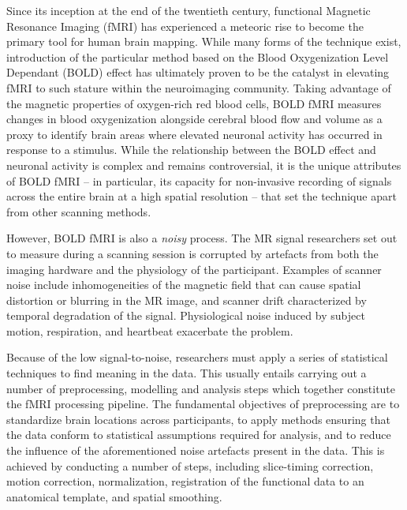 Since its inception at the end of the twentieth century, functional Magnetic Resonance Imaging (fMRI) has experienced a meteoric rise to become the primary tool for human brain mapping. While many forms of the technique exist, introduction of the particular method based on the Blood Oxygenization Level Dependant (BOLD) effect has ultimately proven to be the catalyst in elevating fMRI to such stature within the neuroimaging community. Taking advantage of the magnetic properties of oxygen-rich red blood cells, BOLD fMRI measures changes in blood oxygenization alongside cerebral blood flow and volume as a proxy to identify brain areas where elevated neuronal activity has occurred in response to a stimulus. While the relationship between the BOLD effect and neuronal activity is complex and remains controversial, it is the unique attributes of BOLD fMRI -- in particular, its capacity for non-invasive recording of signals across the entire brain at a high spatial resolution -- that set the technique apart from other scanning methods.

However, BOLD fMRI is also a \textit{noisy} process. The MR signal researchers set out to measure during a scanning session is corrupted by artefacts from both the imaging hardware and the physiology of the participant. Examples of scanner noise include inhomogeneities of the magnetic field that can cause spatial distortion or blurring in the MR image, and scanner drift characterized by temporal degradation of the signal. Physiological noise induced by subject motion, respiration, and heartbeat exacerbate the problem. 

Because of the low signal-to-noise, researchers must apply a series of statistical techniques to find meaning in the data. This usually entails carrying out a number of preprocessing, modelling and analysis steps which together constitute the fMRI processing pipeline. The fundamental objectives of preprocessing are to standardize brain locations across participants, to apply methods ensuring that the data conform to statistical assumptions required for analysis, and to reduce the influence of the aforementioned noise artefacts present in the data. This is achieved by conducting a number of steps, including slice-timing correction, motion correction, normalization, registration of the functional data to an anatomical template, and spatial smoothing. 

